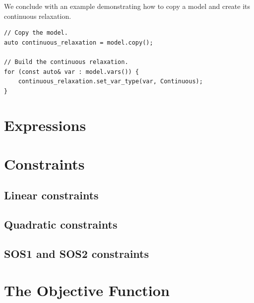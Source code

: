 We conclude with an example demonstrating how to copy a model and create its
continuous relaxation.
%
\begin{lstlisting}
// Copy the model.
auto continuous_relaxation = model.copy();

// Build the continuous relaxation. 
for (const auto& var : model.vars()) {
    continuous_relaxation.set_var_type(var, Continuous);
}
\end{lstlisting}

\section{Expressions \wip}
\label{sec:expressions}

\section{Constraints \wip}

\subsection{Linear constraints}

\subsection{Quadratic constraints}

\subsection{SOS1 and SOS2 constraints}

\section{The Objective Function \wip}
